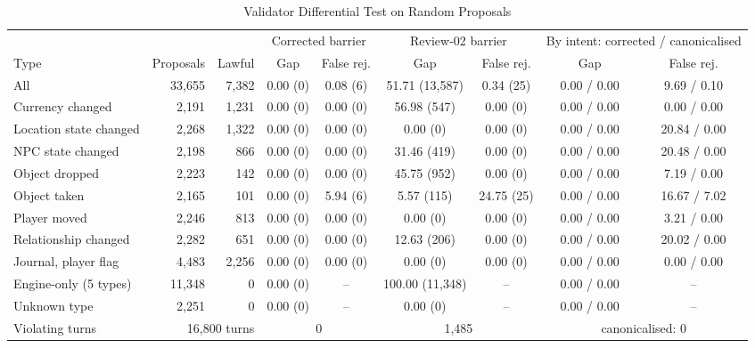 \documentclass[letterpaper,journal,onecolumn]{IEEEtran}
\begin{document}
\begin{table}[H]
\centering\footnotesize
\setlength{\tabcolsep}{3pt}
\caption{Validator Differential Test on Random Proposals}
\label{tab:differential}
\begin{adjustbox}{max width=\linewidth}
\begin{tabular}{@{}lrrcccccc@{}}
\toprule
 & & & \multicolumn{2}{c}{Corrected barrier} & \multicolumn{2}{c}{Review-02 barrier} & \multicolumn{2}{c}{By intent: corrected / canonicalised} \\
\cmidrule(lr){4-5}\cmidrule(lr){6-7}\cmidrule(l){8-9}
Type & Proposals & Lawful & Gap & False rej. & Gap & False rej. & Gap & False rej. \\
\midrule
All & 33{,}655 & 7{,}382 & 0.00 (0) & 0.08 (6) & 51.71 (13{,}587) & 0.34 (25) & 0.00 / 0.00 & 9.69 / 0.10 \\
Currency changed & 2{,}191 & 1{,}231 & 0.00 (0) & 0.00 (0) & 56.98 (547) & 0.00 (0) & 0.00 / 0.00 & 0.00 / 0.00 \\
Location state changed & 2{,}268 & 1{,}322 & 0.00 (0) & 0.00 (0) & 0.00 (0) & 0.00 (0) & 0.00 / 0.00 & 20.84 / 0.00 \\
NPC state changed & 2{,}198 & 866 & 0.00 (0) & 0.00 (0) & 31.46 (419) & 0.00 (0) & 0.00 / 0.00 & 20.48 / 0.00 \\
Object dropped & 2{,}223 & 142 & 0.00 (0) & 0.00 (0) & 45.75 (952) & 0.00 (0) & 0.00 / 0.00 & 7.19 / 0.00 \\
Object taken & 2{,}165 & 101 & 0.00 (0) & 5.94 (6) & 5.57 (115) & 24.75 (25) & 0.00 / 0.00 & 16.67 / 7.02 \\
Player moved & 2{,}246 & 813 & 0.00 (0) & 0.00 (0) & 0.00 (0) & 0.00 (0) & 0.00 / 0.00 & 3.21 / 0.00 \\
Relationship changed & 2{,}282 & 651 & 0.00 (0) & 0.00 (0) & 12.63 (206) & 0.00 (0) & 0.00 / 0.00 & 20.02 / 0.00 \\
Journal, player flag & 4{,}483 & 2{,}256 & 0.00 (0) & 0.00 (0) & 0.00 (0) & 0.00 (0) & 0.00 / 0.00 & 0.00 / 0.00 \\
Engine-only (5 types) & 11{,}348 & 0 & 0.00 (0) & -- & 100.00 (11{,}348) & -- & 0.00 / 0.00 & -- \\
Unknown type & 2{,}251 & 0 & 0.00 (0) & -- & 0.00 (0) & -- & 0.00 / 0.00 & -- \\
\midrule
Violating turns & \multicolumn{2}{r}{16{,}800 turns} & \multicolumn{2}{c}{0} & \multicolumn{2}{c}{1{,}485} & \multicolumn{2}{c}{canonicalised: 0} \\
\bottomrule
\end{tabular}
\end{adjustbox}
\end{table}
\end{document}
